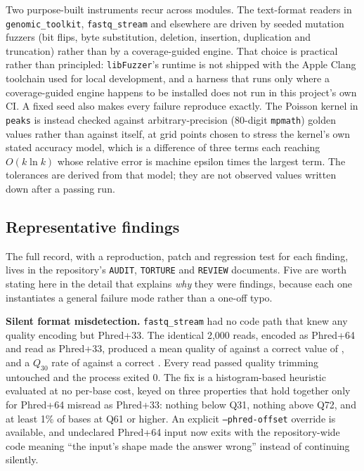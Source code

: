 \documentclass[10pt,twocolumn]{article}
\begin{document}
Two purpose-built instruments recur across modules. The text-format readers
in \texttt{genomic\_toolkit}, \texttt{fastq\_stream} and elsewhere are driven
by seeded mutation fuzzers (bit flips, byte substitution, deletion,
insertion, duplication and truncation) rather than by a coverage-guided
engine. That choice is practical rather than principled:
\texttt{libFuzzer}'s runtime is not shipped with the Apple Clang toolchain
used for local development, and a harness that runs only where a
coverage-guided engine happens to be installed does not run in this project's
own CI. A fixed seed also makes every failure reproduce exactly. The Poisson
kernel in \texttt{peaks} is instead checked against arbitrary-precision
(80-digit \texttt{mpmath}) golden values rather than against itself, at grid
points chosen to stress the kernel's own stated accuracy model, which is a
difference of three terms each reaching $O(k\ln k)$ whose relative error is
machine epsilon times the largest term. The tolerances are derived from that
model; they are not observed values written down after a passing run.

\subsection{Representative findings}

The full record, with a reproduction, patch and regression test for each
finding, lives in the repository's \texttt{AUDIT}, \texttt{TORTURE} and
\texttt{REVIEW} documents. Five are worth stating here in the detail that
explains \emph{why} they were findings, because each one instantiates a
general failure mode rather than a one-off typo.

\textbf{Silent format misdetection.} \texttt{fastq\_stream} had no code path
that knew any quality encoding but Phred+33. The identical 2,000 reads,
encoded as Phred+64 and read as Phred+33, produced a mean quality of
\PhredMisreadMeanQSixtyFour{} against a correct value of
\PhredMisreadMeanQThirtyThree{}, and a $Q_{30}$ rate of
\PhredMisreadQThirtyRateHigh{} against a correct \PhredMisreadQThirtyRateLow{}.
Every read passed quality trimming untouched and the process exited 0. The
fix is a histogram-based heuristic evaluated at no per-base cost, keyed on
three properties that hold together only for Phred+64 misread as Phred+33:
nothing below Q31, nothing above Q72, and at least 1\% of bases at Q61 or
higher. An explicit \texttt{--phred-offset} override is available, and
undeclared Phred+64 input now exits with the repository-wide code meaning
``the input's shape made the answer wrong'' instead of continuing silently.
\end{document}
